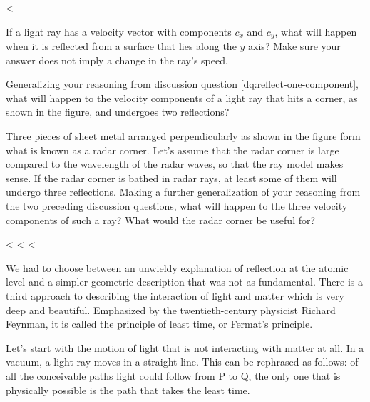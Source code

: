 <%

\startdqs

\begin{dq}\label{dq:reflect-one-component}
If a light ray has a velocity vector with components
$c_x$ and $c_y$, what will happen when it is reflected from
a surface that lies along the $y$ axis? Make sure your
answer does not imply a change in the ray's speed.
\end{dq}

\begin{dq}\label{dq:radar-corner-2d}
Generalizing your reasoning from discussion question 
\ref{dq:reflect-one-component},
what will happen to the velocity components of a light ray
that hits a corner, as shown in the figure, and undergoes two reflections?
\end{dq}

\begin{dq}\label{dq:radar-corner-3d}
Three pieces of sheet metal arranged perpendicularly as
shown in the figure form what is known as a radar corner.
Let's assume that the radar corner is large compared to the
wavelength of the radar waves, so that the ray model makes
sense. If the radar corner is bathed in radar rays, at least
some of them will undergo three reflections. Making a
further generalization of your reasoning from the two
preceding discussion questions, what will happen to the
three velocity components of such a ray? What would the
radar corner be useful for?
\end{dq}

\vspace{50mm}

<%
<%
<%

We had to choose between an unwieldy explanation of
reflection at the atomic level and a simpler geometric
description that was not as fundamental. There is a third
approach to describing the interaction of light and matter
which is very deep and beautiful. Emphasized by the
twentieth-century physicist Richard Feynman, it is called
the principle of least time, or
Fermat's principle.

Let's start with the motion of light that is not interacting
with matter at all. In a vacuum, a light ray moves in a
straight line. This can be rephrased as follows: of all the
conceivable paths light could follow from P to Q, the
only one that is physically possible is the path that
takes the least time.

